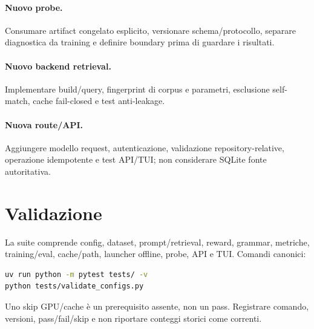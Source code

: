 \paragraph{Nuovo probe.} Consumare artifact congelato esplicito, versionare
schema/protocollo, separare diagnostica da training e definire boundary prima di
guardare i risultati.
\paragraph{Nuovo backend retrieval.} Implementare build/query, fingerprint di
corpus e parametri, esclusione self-match, cache fail-closed e test anti-leakage.
\paragraph{Nuova route/API.} Aggiungere modello request, autenticazione,
validazione repository-relative, operazione idempotente e test API/TUI; non
considerare SQLite fonte autoritativa.

\section{Validazione}
La suite comprende config, dataset, prompt/retrieval, reward, grammar, metriche,
training/eval, cache/path, launcher offline, probe, API e TUI. Comandi canonici:
\begin{lstlisting}[language=bash]
uv run python -m pytest tests/ -v
python tests/validate_configs.py
\end{lstlisting}
Uno skip GPU/cache è un prerequisito assente, non un pass. Registrare comando,
versioni, pass/fail/skip e non riportare conteggi storici come correnti.
